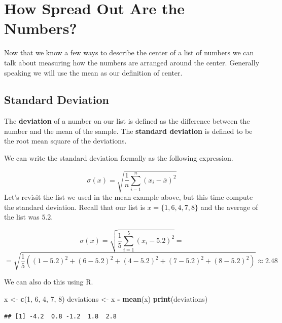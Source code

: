 \documentclass[]{book}
\newenvironment{Shaded}{\begin{snugshade}}{\end{snugshade}}
\newcommand{\DecValTok}[1]{\textcolor[rgb]{0.00,0.00,0.81}{#1}}
\newcommand{\KeywordTok}[1]{\textcolor[rgb]{0.13,0.29,0.53}{\textbf{#1}}}
\newcommand{\NormalTok}[1]{#1}
\newcommand{\OperatorTok}[1]{\textcolor[rgb]{0.81,0.36,0.00}{\textbf{#1}}}
\newcommand{\StringTok}[1]{\textcolor[rgb]{0.31,0.60,0.02}{#1}}
\begin{document}
\hypertarget{how-spread-out-are-the-numbers}{%
\section{How Spread Out Are the Numbers?}\label{how-spread-out-are-the-numbers}}

Now that we know a few ways to describe the center of a list of numbers we can talk about measuring how the numbers are arranged around the center. Generally speaking we will use the mean as our definition of center.

\hypertarget{standard-deviation}{%
\subsection{Standard Deviation}\label{standard-deviation}}

The \textbf{deviation} of a number on our list is defined as the difference between the number and the mean of the sample. The \textbf{standard deviation} is defined to be the root mean square of the deviations.

We can write the standard deviation formally as the following expression.

\[\sigma(x) = \sqrt{\frac{1}{n}\sum_{i-1}^n (x_i - \bar{x})^2}\]
Let's revisit the list we used in the mean example above, but this time compute the standard deviation. Recall that our list is \(x = \{1, 6, 4, 7, 8\}\) and the average of the list was \(5.2\).

\[\sigma(x) = \sqrt{\frac{1}{5} \sum_{i=1}^5 (x_i - 5.2)^2} = \]
\[ = \sqrt{ \frac{1}{5} ((1 - 5.2)^2 + (6 - 5.2)^2 + (4 - 5.2)^2 + (7 - 5.2)^2 + (8 - 5.2)^2)} \approx 2.48 \]

We can also do this using R.

\begin{Shaded}
\begin{Highlighting}[]
\NormalTok{x <-}\StringTok{ }\KeywordTok{c}\NormalTok{(}\DecValTok{1}\NormalTok{, }\DecValTok{6}\NormalTok{, }\DecValTok{4}\NormalTok{, }\DecValTok{7}\NormalTok{, }\DecValTok{8}\NormalTok{)}
\NormalTok{deviations <-}\StringTok{ }\NormalTok{x }\OperatorTok{-}\StringTok{ }\KeywordTok{mean}\NormalTok{(x)}
\KeywordTok{print}\NormalTok{(deviations)}
\end{Highlighting}
\end{Shaded}

\begin{verbatim}
## [1] -4.2  0.8 -1.2  1.8  2.8
\end{verbatim}
\end{document}
